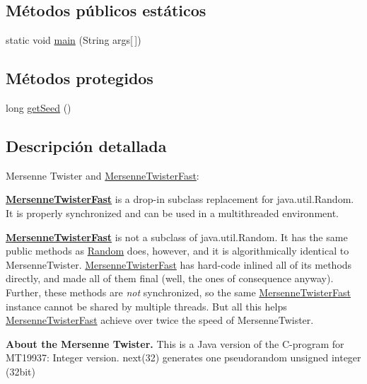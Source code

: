 \subsection*{Métodos públicos estáticos}
\begin{DoxyCompactItemize}
\item 
static void \hyperlink{classjenes_1_1utils_1_1_mersenne_twister_fast_a5c955ea4cf1b925290dd92ddecc0c510}{main} (String args\mbox{[}$\,$\mbox{]})
\end{DoxyCompactItemize}
\subsection*{Métodos protegidos}
\begin{DoxyCompactItemize}
\item 
long \hyperlink{classjenes_1_1utils_1_1_mersenne_twister_fast_a88963c0469e0bad7a1834469cf0f7a10}{get\-Seed} ()
\end{DoxyCompactItemize}


\subsection{Descripción detallada}
Mersenne Twister and \hyperlink{classjenes_1_1utils_1_1_mersenne_twister_fast}{Mersenne\-Twister\-Fast}\-: 

{\bfseries \hyperlink{classjenes_1_1utils_1_1_mersenne_twister_fast}{Mersenne\-Twister\-Fast}} is a drop-\/in subclass replacement for java.\-util.\-Random. It is properly synchronized and can be used in a multithreaded environment.

{\bfseries \hyperlink{classjenes_1_1utils_1_1_mersenne_twister_fast}{Mersenne\-Twister\-Fast}} is not a subclass of java.\-util.\-Random. It has the same public methods as \hyperlink{classjenes_1_1utils_1_1_random}{Random} does, however, and it is algorithmically identical to Mersenne\-Twister. \hyperlink{classjenes_1_1utils_1_1_mersenne_twister_fast}{Mersenne\-Twister\-Fast} has hard-\/code inlined all of its methods directly, and made all of them final (well, the ones of consequence anyway). Further, these methods are {\itshape not} synchronized, so the same \hyperlink{classjenes_1_1utils_1_1_mersenne_twister_fast}{Mersenne\-Twister\-Fast} instance cannot be shared by multiple threads. But all this helps \hyperlink{classjenes_1_1utils_1_1_mersenne_twister_fast}{Mersenne\-Twister\-Fast} achieve over twice the speed of Mersenne\-Twister.

{\bfseries About the Mersenne Twister. } This is a Java version of the C-\/program for M\-T19937\-: Integer version. next(32) generates one pseudorandom unsigned integer (32bit)

